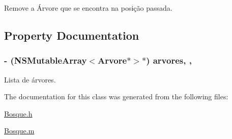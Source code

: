 Remove a Árvore que se encontra na posição passada. 



\subsection{Property Documentation}
\hypertarget{interface_bosque_a4fd04f7b8ff01ab2b7cecb94e4c866f3}{}
\subsubsection[{arvores}]{\setlength{\rightskip}{0pt plus 5cm}-\/ (N\+S\+Mutable\+Array$<${\bf Arvore}$\ast$$>$$\ast$) arvores\hspace{0.3cm}{\ttfamily [read]}, {\ttfamily [write]}, {\ttfamily [atomic]}}\label{interface_bosque_a4fd04f7b8ff01ab2b7cecb94e4c866f3}


Lista de árvores. 



The documentation for this class was generated from the following files\+:\begin{DoxyCompactItemize}
\item 
\hyperlink{_bosque_8h}{Bosque.\+h}\item 
\hyperlink{_bosque_8m}{Bosque.\+m}\end{DoxyCompactItemize}
